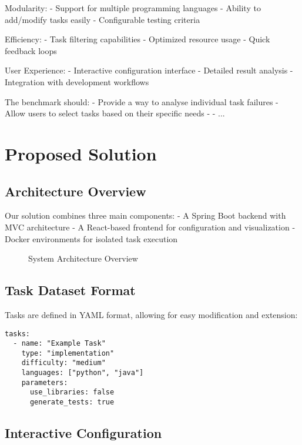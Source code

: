 Modularity:
- Support for multiple programming languages
- Ability to add/modify tasks easily
- Configurable testing criteria

Efficiency:
- Task filtering capabilities
- Optimized resource usage
- Quick feedback loops

User Experience:
- Interactive configuration interface
- Detailed result analysis
- Integration with development workflows

The benchmark should:
- Provide a way to analyse individual task failures
- Allow users to select tasks based on their specific needs
-
- ...

\chapter{Proposed Solution}

\section{Architecture Overview}

Our solution combines three main components:
- A Spring Boot backend with MVC architecture
- A React-based frontend for configuration and visualization
- Docker environments for isolated task execution

\begin{figure}[h]
    \centering
    \caption{System Architecture Overview}
    \label{fig:architecture}
\end{figure}

\section{Task Dataset Format}

Tasks are defined in YAML format, allowing for easy modification and extension:

\begin{verbatim}
tasks:
  - name: "Example Task"
    type: "implementation"
    difficulty: "medium"
    languages: ["python", "java"]
    parameters:
      use_libraries: false
      generate_tests: true
\end{verbatim}

\section{Interactive Configuration}

